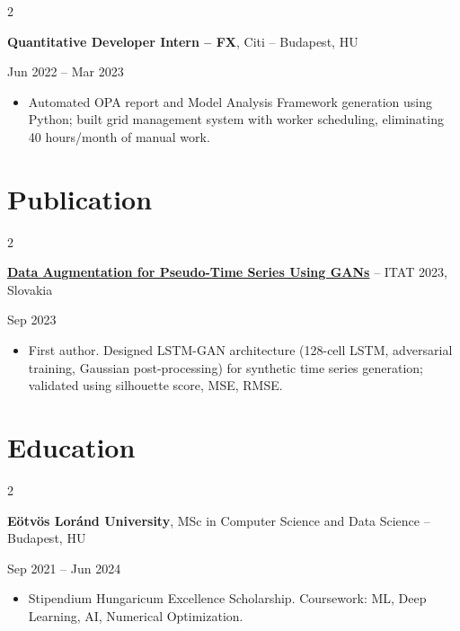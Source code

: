 \documentclass[10pt, a4paper]{article}
\newenvironment{highlights}{
    \begin{itemize}[
        topsep=0.10 cm,
        parsep=0.10 cm,
        partopsep=0pt,
        itemsep=0pt,
        leftmargin=10pt
    ]
}{
    \end{itemize}
}
\newenvironment{onecolentry}{\par}{\par}
\newenvironment{twocolentry}[2][]{
    \def\secondColumn{#2}
    \setcolumnwidth{\fill, 4.5 cm}
    \begin{paracol}{2}
}{
    \switchcolumn \raggedleft \secondColumn
    \end{paracol}
}
\begin{document}
\vspace{0.1 cm}

\begin{twocolentry}{Jun 2022 -- Mar 2023}
    \textbf{Quantitative Developer Intern -- FX}, Citi -- Budapest, HU
\end{twocolentry}
\begin{onecolentry}
    \begin{highlights}
        \item Automated OPA report and Model Analysis Framework generation using Python; built grid management system with worker scheduling, eliminating 40 hours/month of manual work.
    \end{highlights}
\end{onecolentry}

\section{Publication}

\begin{twocolentry}{Sep 2023}
    \href{https://ceur-ws.org/Vol-3498/paper5.pdf}{\textbf{Data Augmentation for Pseudo-Time Series Using GANs}} -- ITAT 2023, Slovakia
\end{twocolentry}
\begin{onecolentry}
    \begin{highlights}
        \item First author. Designed LSTM-GAN architecture (128-cell LSTM, adversarial training, Gaussian post-processing) for synthetic time series generation; validated using silhouette score, MSE, RMSE.
    \end{highlights}
\end{onecolentry}

\section{Education}

\begin{twocolentry}{Sep 2021 -- Jun 2024}
    \textbf{Eötvös Loránd University}, MSc in Computer Science and Data Science -- Budapest, HU
\end{twocolentry}
\begin{onecolentry}
    \begin{highlights}
        \item Stipendium Hungaricum Excellence Scholarship. Coursework: ML, Deep Learning, AI, Numerical Optimization.
    \end{highlights}
\end{onecolentry}
\end{document}
